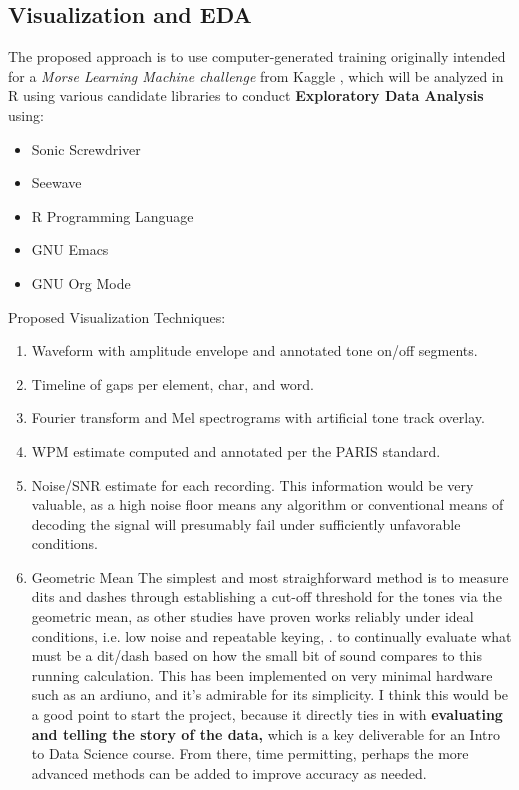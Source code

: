 \documentclass[11pt]{article}
\begin{document}
\subsection{Visualization and EDA}
\label{sec:org615a903}
The proposed approach is to use computer-generated training originally intended for a \emph{Morse Learning Machine challenge} from Kaggle \autocite{ag1le2014},
which will be analyzed in R using various candidate libraries to conduct \textbf{Exploratory Data Analysis} using:
\begin{itemize}
\item Sonic Screwdriver \autocite{ssdriverCran}
\item Seewave \autocite{seewaveCran}
\item R Programming Language \autocite{RLang}
\item GNU Emacs \autocite{emacs}
\item GNU Org Mode \autocite{orgmode}
\end{itemize}

Proposed Visualization Techniques:
\begin{enumerate}
\item Waveform with amplitude envelope and annotated tone on/off segments.
\item Timeline of gaps per element, char, and word.
\item Fourier transform and Mel spectrograms with artificial tone track overlay.
\item WPM estimate computed and annotated per the PARIS standard.
\item Noise/SNR estimate for each recording.
This information would be very valuable, as a high noise floor means any algorithm or
conventional means of decoding the signal will presumably fail under sufficiently unfavorable conditions.
\item Geometric Mean
The simplest and most straighforward method is to measure dits and dashes through establishing a cut-off
threshold for the tones via the geometric mean, as other studies have proven works reliably under ideal conditions, i.e. low noise and repeatable keying,
\autocite{geomMeanK4ICY}. to continually evaluate what must be a dit/dash based on how the small bit of sound compares to this running calculation.
This has been implemented on very minimal hardware such as an ardiuno, and it's admirable for its simplicity. I think this would be a good point to
start the project, because it directly ties in with \textbf{evaluating and telling the story of the data,} which is a key deliverable for an
Intro to Data Science course. From there, time permitting, perhaps the more advanced methods
can be added to improve accuracy as needed.
\end{enumerate}
\end{document}
